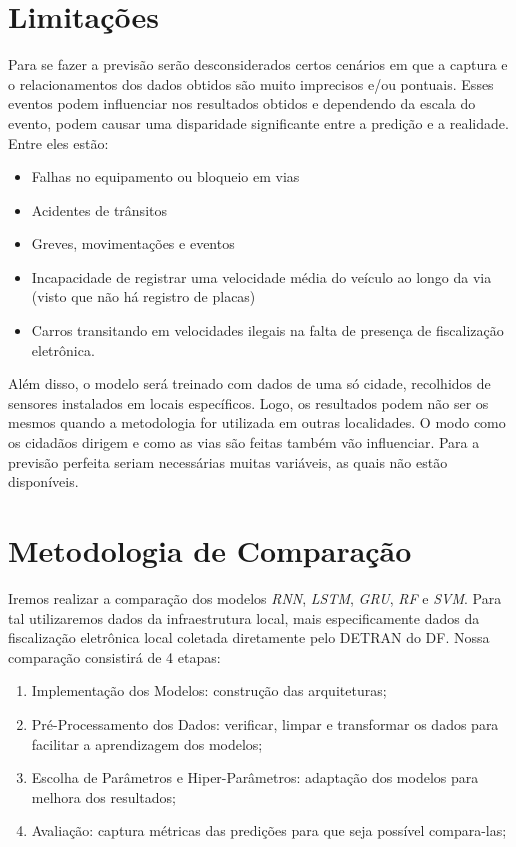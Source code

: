 \section{Limitações}

Para se fazer a previsão serão desconsiderados certos cenários em que a captura e o relacionamentos dos dados obtidos são muito imprecisos e/ou pontuais. Esses eventos podem influenciar nos resultados obtidos e dependendo da escala do evento, podem causar uma disparidade significante entre a predição e a realidade. Entre eles estão:

\begin{itemize}
    \item Falhas no equipamento ou bloqueio em vias
    \item Acidentes de trânsitos
    \item Greves, movimentações e eventos
    \item Incapacidade de registrar uma velocidade média do veículo ao longo da via (visto que não há registro de placas)
    \item Carros transitando em velocidades ilegais na falta de presença de fiscalização eletrônica.
\end{itemize}

Além disso, o modelo será treinado com dados de uma só cidade, recolhidos de sensores instalados em locais específicos. Logo, os resultados podem não ser os mesmos quando a metodologia for utilizada em outras localidades. O modo como os cidadãos dirigem e como as vias são feitas também vão influenciar. Para a previsão perfeita seriam necessárias muitas variáveis, as quais não estão disponíveis.

\section{Metodologia de Comparação}

Iremos realizar a comparação dos modelos \textit{\acrshort{RNN}}, \textit{\acrshort{LSTM}}, \textit{\acrshort{GRU}}, \textit{\acrshort{RF}} e \textit{\acrshort{SVM}}. Para tal utilizaremos dados da infraestrutura local, mais especificamente dados da fiscalização eletrônica local coletada diretamente pelo \acrfull{DETRAN} do \acrfull{DF}. Nossa comparação consistirá de 4 etapas:

\begin{enumerate}
    \item Implementação dos Modelos: construção das arquiteturas;
    \item Pré-Processamento dos Dados: verificar, limpar e transformar os dados para facilitar a aprendizagem dos modelos;
    \item Escolha de Parâmetros e Hiper-Parâmetros: adaptação dos modelos para melhora dos resultados;
    \item Avaliação: captura métricas das predições para que seja possível compara-las;
\end{enumerate}

